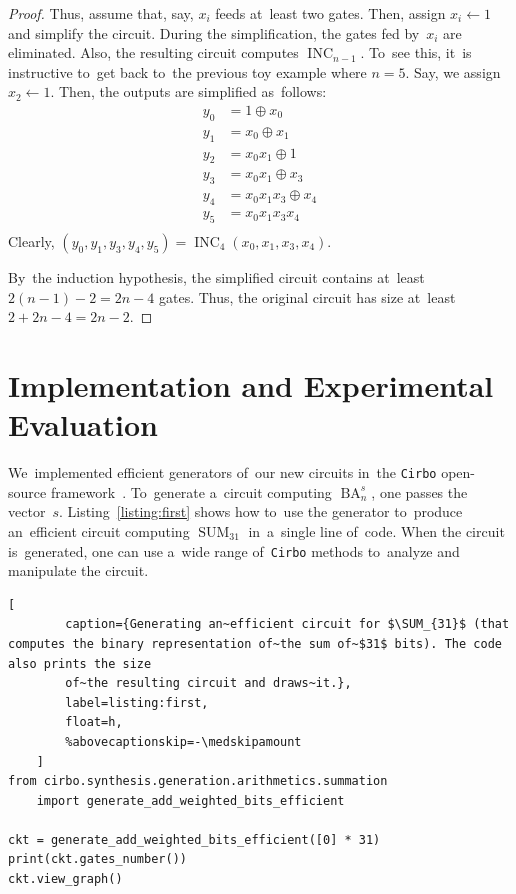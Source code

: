 \documentclass[a4paper, UKenglish, cleveref, autoref,  thm-restate, anonymous]{lipics-v2021}
\DeclareMathOperator{\SUM}{SUM}
\DeclareMathOperator{\BA}{BA}
\DeclareMathOperator{\INC}{INC}
\begin{document}
\begin{proof}
        Thus, assume that, say, $x_i$ feeds at~least two gates. Then, assign $x_i \gets 1$ and simplify the circuit. During the simplification, the gates fed by~$x_i$ are eliminated. Also, the resulting circuit computes $\INC_{n-1}$. To~see this,
        it~is instructive
        to~get back to~the previous toy example where $n=5$. Say, we assign $x_2 \gets 1$. Then, the outputs are simplified as~follows:
        \begin{align*}
            y_0 &= 1 \oplus x_0\\
            y_1 &= x_0 \oplus x_1\\
            y_2 &= x_0x_1 \oplus 1\\
            y_3 &= x_0x_1 \oplus x_3\\
            y_4 &= x_0x_1x_3 \oplus x_4\\
            y_5 &= x_0x_1x_3x_4\\
        \end{align*}
        Clearly, $(y_0,y_1,y_3,y_4,y_5)=\INC_4(x_0, x_1, x_3, x_4)$.

        By~the induction hypothesis, the simplified circuit contains at~least $2(n-1)-2=2n-4$ gates. Thus, the original circuit has size at~least $2+2n-4=2n-2$.
    \end{proof}


    \section{Implementation and Experimental Evaluation}

    We~implemented efficient generators of~our new circuits in~the \texttt{Cirbo} open-source framework~\cite{DBLP:conf/aaai/AverkovBEGKKKLL25}.
    To~generate a~circuit computing $\BA_n^s$, one passes the vector~$s$. Listing~\ref{listing:first} shows how to~use the generator
    to~produce an~efficient circuit computing $\SUM_{31}$ in~a~single line of~code.
    When the circuit is~generated, one can use a~wide range of~\texttt{Cirbo} methods to~analyze and manipulate the circuit.

    \begin{lstlisting}[
        caption={Generating an~efficient circuit for $\SUM_{31}$ (that computes the binary representation of~the sum of~$31$ bits). The code also prints the size
        of~the resulting circuit and draws~it.},
        label=listing:first,
        float=h,
        %abovecaptionskip=-\medskipamount
    ]
from cirbo.synthesis.generation.arithmetics.summation
    import generate_add_weighted_bits_efficient

ckt = generate_add_weighted_bits_efficient([0] * 31)
print(ckt.gates_number())
ckt.view_graph()
    \end{lstlisting}
\end{document}

